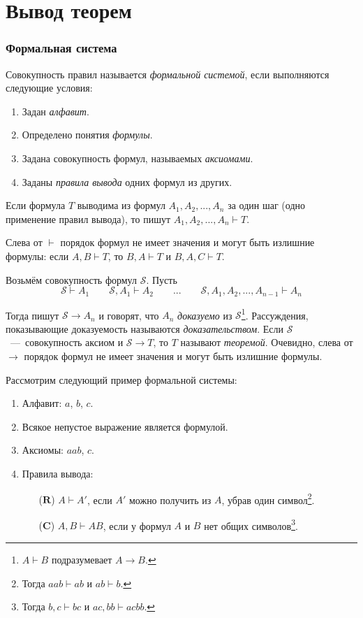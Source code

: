 \part{Вывод теорем}

\section{Формальная система}

Совокупность правил называется {\it формальной системой}, если выполняются следующие
условия:
\begin{enumerate}
	\item{}Задан {\it алфавит}.
	\item{}Определено понятия {\it формулы}.
	\item{}Задана совокупность формул, называемых {\it аксиомами}.
	\item{}Заданы {\it правила вывода} одних формул из других.
\end{enumerate}

Если формула $T$ выводима из формул $A_1,A_2,...,A_{n}$ за один шаг (одно применение
правил вывода), то пишут $A_1,A_2,...,A_{n}\vdash T$.

Слева от $\vdash$ порядок формул не имеет значения и могут быть излишние формулы:
если $A,B\vdash T$, то $B,A\vdash T$ и $B,A,C\vdash T$.

\newcommand\Sx{\mathcal S}
Возьмём совокупность формул $\Sx$. Пусть
\[
	\Sx\vdash A_1\qquad
	\Sx,A_1\vdash A_2\qquad...\qquad
	\Sx,A_1,A_2,...,A_{n-1}\vdash A_{n}
\]

Тогда пишут $\Sx\to A_{n}$ и говорят, что $A_{n}$ {\it доказуемо} из $\Sx$\footnote{
	$A\vdash B$ подразумевает $A\to B$.
}.
Рассуждения, показывающие доказуемость называются {\it доказательством}.
Если $\Sx$~---~совокупность аксиом и $\Sx\to T$, то $T$ называют
{\it теоремой}. Очевидно, слева от $\to$ порядок формул
не имеет значения и могут быть излишние формулы.

\newcommand\ruleR{\mathbf{R}}
\newcommand\ruleC{\mathbf{C}}

Рассмотрим следующий пример формальной системы:
\begin{enumerate}
	\item{}Алфавит: $a$, $b$, $c$.
	\item{}Всякое непустое выражение является формулой.
	\item{}Аксиомы: $aab$, $c$.
	\item{}Правила вывода:
	\begin{enumerate}
		\item[($\ruleR$)]{}$A\vdash A'$, если $A'$ можно получить из $A$,
		убрав один символ\footnote{Тогда $aab\vdash ab$ и $ab\vdash b$.}.
		\item[($\ruleC$)]{}$A,B\vdash AB$, если у формул $A$ и $B$ нет
		общих символов\footnote{Тогда $b,c\vdash bc$ и $ac,bb\vdash acbb$.}.
	\end{enumerate}
\end{enumerate}

